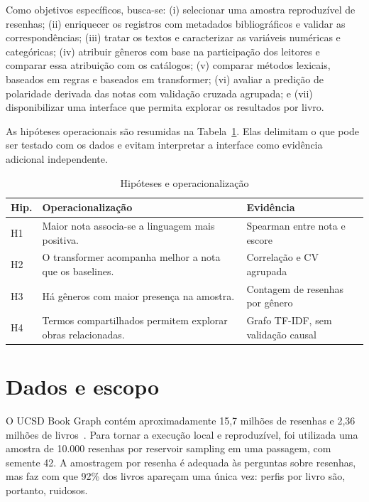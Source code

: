 \documentclass[conference]{IEEEtran}
\begin{document}
Como objetivos específicos, busca-se: (i) selecionar uma amostra reproduzível
de resenhas; (ii) enriquecer os registros com metadados bibliográficos e validar
as correspondências; (iii) tratar os textos e caracterizar as variáveis
numéricas e categóricas; (iv) atribuir gêneros com base na participação dos
leitores e comparar essa atribuição com os catálogos; (v) comparar métodos
lexicais, baseados em regras e baseados em transformer; (vi) avaliar a predição
de polaridade derivada das notas com validação cruzada agrupada; e (vii)
disponibilizar uma interface que permita explorar os resultados por livro.

As hipóteses operacionais são resumidas na Tabela~\ref{tab:hipoteses}. Elas
delimitam o que pode ser testado com os dados e evitam interpretar a interface
como evidência adicional independente.

\begin{table}[!t]
\caption{Hipóteses e operacionalização}
\label{tab:hipoteses}
\centering
\begin{tabular}{p{}p{}p{}}
\toprule
\textbf{Hip.} & \textbf{Operacionalização} & \textbf{Evidência}\\
\midrule
H1 & Maior nota associa-se a linguagem mais positiva. & Spearman entre nota e escore\\
H2 & O transformer acompanha melhor a nota que os baselines. & Correlação e CV agrupada\\
H3 & Há gêneros com maior presença na amostra. & Contagem de resenhas por gênero\\
H4 & Termos compartilhados permitem explorar obras relacionadas. & Grafo TF-IDF, sem validação causal\\
\bottomrule
\end{tabular}
\end{table}

\section{Dados e escopo}

O UCSD Book Graph contém aproximadamente 15,7 milhões de resenhas e 2,36
milhões de livros~\cite{wan2018}. Para tornar a execução local e reproduzível,
foi utilizada uma amostra de 10.000 resenhas por reservoir sampling em uma
passagem, com semente 42. A amostragem por resenha é adequada às perguntas
sobre resenhas, mas faz com que 92\% dos livros apareçam uma única vez: perfis
por livro são, portanto, ruidosos.
\end{document}
